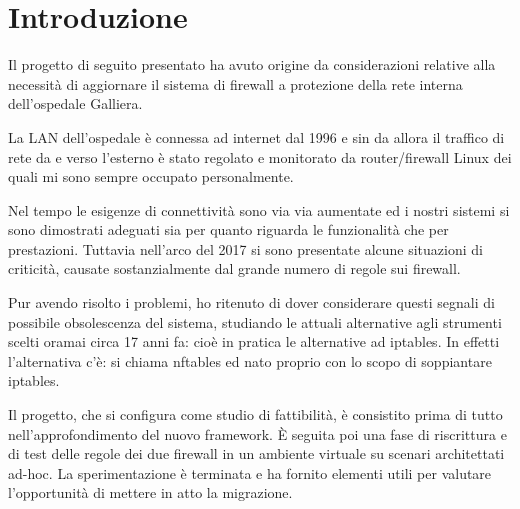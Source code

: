 

\chapter{Introduzione} %

\label{Chapter1} %


\newcommand{\keyword}[1]{\textbf{#1}}
\newcommand{\tabhead}[1]{\textbf{#1}}
\newcommand{\code}[1]{\texttt{#1}}
\newcommand{\file}[1]{\texttt{\bfseries#1}}
\newcommand{\option}[1]{\texttt{\itshape#1}}


Il progetto di seguito presentato ha avuto origine da considerazioni
relative alla necessit\`a di aggiornare il sistema di firewall a protezione
della rete interna dell'ospedale Galliera.

La LAN dell'ospedale \`e connessa ad internet dal 1996 e sin da allora il
traffico di rete da e verso l'esterno \`e stato regolato e monitorato da
router/firewall Linux dei quali mi sono sempre occupato personalmente.

Nel tempo le esigenze di connettivit\`a sono via via aumentate ed i nostri
sistemi si sono dimostrati adeguati sia per quanto riguarda le funzionalit\`a
che per prestazioni.
Tuttavia nell'arco del 2017 si sono presentate alcune situazioni di
criticit\`a, causate sostanzialmente dal grande numero di regole sui firewall.

Pur avendo risolto i problemi, ho ritenuto di dover considerare questi segnali
di possibile obsolescenza del sistema, studiando le attuali alternative agli
strumenti scelti oramai circa 17 anni fa: cio\`e in pratica le alternative ad
iptables.  In effetti l'alternativa c'\`e: si chiama nftables ed nato proprio
con lo scopo di soppiantare iptables.

Il progetto, che si configura come studio di fattibilit\`a, \`e consistito
prima di tutto nell'approfondimento del nuovo framework. \`E seguita poi una
fase di riscrittura e di test delle regole dei due firewall in un ambiente
virtuale su scenari architettati ad-hoc. La sperimentazione \`e terminata e ha
fornito elementi utili per valutare l'opportunit\`a di mettere in atto la
migrazione. 


